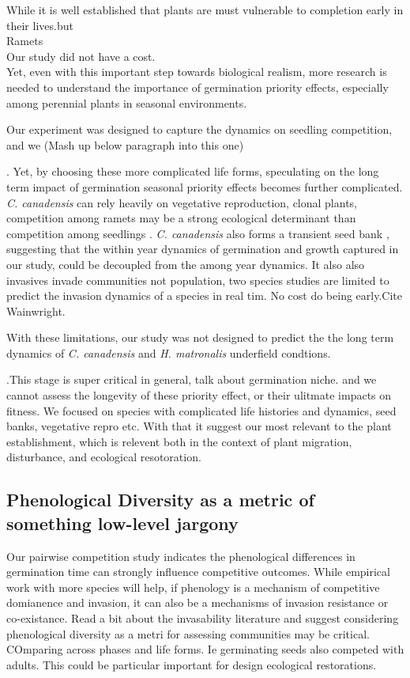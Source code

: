 \documentclass{article}\usepackage[]{graphicx}\usepackage[]{color}
\begin{document}
While it is well established that plants are must vulnerable to completion early in their lives.but\\
Ramets\\
Our study did not have a cost.
\\
Yet, even with this important step towards biological realism, more research is needed to understand the importance of germination priority effects, especially among perennial plants in seasonal environments.


Our experiment was designed to capture the dynamics on seedling competition, and we  (Mash up below paragraph into this one)

. Yet, by choosing these more complicated life forms, speculating on the long term impact of germination seasonal priority effects becomes further complicated. \textit{C. canadensis} can rely heavily on vegetative reproduction, clonal plants, competition among ramets may be a strong ecological determinant than competition among seedlings \citep{}. \textit{C. canadensis} also forms a transient seed bank \citep{}, suggesting that the within year dynamics of germination and growth captured in our study, could be decoupled from the among year dynamics. It also also invasives invade communities not population, two species studies are limited to predict the invasion dynamics of a species in real tim. No cost do being early.Cite Wainwright.

With these limitations, our study was not designed to predict the the long term dynamics of \textit{C. canadensis} and \textit{H. matronalis} underfield condtions. 

.This stage is super critical in general, talk about germination niche.
and we cannot assess the longevity of these priority effect, or their ulitmate impacts on fitness. We focused on species with complicated life histories and dynamics, seed banks, vegetative repro etc. 
With that it suggest our most relevant to the plant establishment, which is relevent both in the context of plant migration, disturbance, and ecological resotoration.

 

\subsection*{Phenological Diversity as a metric of something low-level jargony}
Our pairwise competition study indicates the phenological differences in germination time can strongly influence competitive outcomes. While empirical work with more species will help, if phenology is a mechanism of competitive domianence and invasion, it can also be a mechanisms of invasion resistance or co-existance. Read a bit about the invasability literature and suggest considering phenological diversity as a metri for assessing communities may be critical. COmparing across phases and life forms. Ie germinating seeds also competed with adults. This could be particular important for design ecological restorations. 
\end{document}
